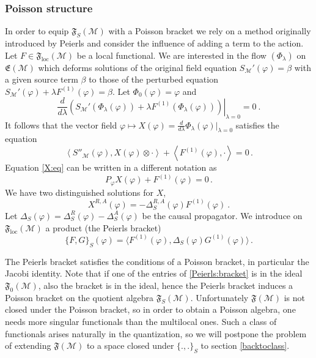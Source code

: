 \documentclass[12pt]{article}
\newcommand{\F}{\mathfrak{F}}
\newcommand{\Mcal}{\mathcal{M}}
\newcommand{\loc}{\mathrm{loc}}
\newcommand{\la}{\lambda}
\newcommand{\ph}{\varphi}
\newcommand{\Poi}[2]{\{#1,#2\}}
\newcommand{\1}{\mathds{1}}                         %
\newcommand{\be}{\begin{equation}}
\newcommand{\ee}{\end{equation}}
\begin{document}
{\subsubsection{Poisson structure}\label{Poisson}
In order to equip $\mathfrak{F}_S(\Mcal)$ with a Poisson bracket we rely on a method originally introduced by Peierls and consider the influence of adding a term to the action. Let $F\in\mathfrak{F}_\loc(\Mcal)$ be a local functional. We are interested in the flow $(\Phi_{\lambda})$ on $\mathfrak{E}(\Mcal)$ which deforms solutions of the original field equation $S_\Mcal'(\ph)=\beta$ with a given source term $\beta$ to those of the perturbed equation $S_\Mcal'(\ph)+\lambda F^{(1)}(\ph)=\beta$. Let $\Phi_0(\ph)=\ph$ and 
\be\label{flow}
\frac{d}{d\lambda}\left.\left(S_\Mcal'(\Phi_{\lambda}(\ph))+\la F^{(1)}(\Phi_{\lambda}(\ph))\right)\right|_{\lambda=0}=0 \ .
\ee
It follows that the vector field $\ph\mapsto X(\ph)=\frac{d}{d\lambda}\Phi_{\lambda}(\ph)|_{\lambda=0}$ satisfies the equation
\be\label{X:eq}
\left<S''_\Mcal(\ph),X(\ph)\otimes\cdot\right>+\left<F^{(1)}(\ph),\cdot\right>=0\,.
\ee
Equation \eqref{X:eq} can be written in a different notation as
\[
P_{\ph}X(\ph)+F^{(1)}(\ph)=0\,.
\]
We have two distinguished solutions for  $X$,
\be
X^{R,A}(\ph)=-\Delta_S^{R,A}(\ph)F^{(1)}(\ph)\ .
\ee
Let $\Delta_S(\ph)=\Delta^R_S(\ph)-\Delta^A_S(\ph)$ be the causal propagator. We introduce on $\mathfrak{F}_\loc(\Mcal)$ a product (the Peierls bracket)
\be\label{Peierls:bracket}
\Poi{F}{G}_S(\ph)=\langle F^{(1)}(\ph), \Delta_S(\ph)G^{(1)}(\ph)\rangle\,.
\ee

The Peierls bracket satisfies the conditions of a Poisson bracket, in particular the Jacobi identity. Note that if one of the entries of \eqref{Peierls:bracket} is in the ideal $\mathfrak{F}_0(\Mcal)$, also the bracket is in the ideal, hence the Peierls bracket induces a Poisson bracket on the quotient algebra $\F_S(\Mcal)$. Unfortunately $\F(\Mcal)$ is not closed under the Poisson bracket, so in order to obtain a Poisson algebra, one needs more singular functionals than the multilocal ones. Such a class of functionals arises naturally in the quantization, so we will postpone the problem of extending $\F(\Mcal)$ to a space closed under $\Poi{.}{.}_S$ to section \ref{backtoclass}.
}
\end{document}

